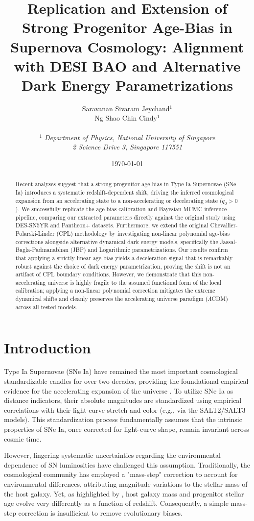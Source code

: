\documentclass[12pt, a4paper]{article}
\title{\textbf{Replication and Extension of Strong Progenitor Age-Bias in Supernova Cosmology: Alignment with DESI BAO and Alternative Dark Energy Parametrizations}}
\author{
    Saravanan Sivaram Jeychand$^{1}$ \\
    Ng Shao Chin Cindy$^{1}$ \\
    \vspace{0.2cm} \\
    \small $^{1}$ \textit{Department of Physics, National University of Singapore} \\
    \small \textit{2 Science Drive 3, Singapore 117551}
}
\date{\today}
\begin{document}
\maketitle

\begin{abstract}
Recent analyses \citep{son2025} suggest that a strong progenitor age-bias in Type Ia Supernovae (SNe Ia) introduces a systematic redshift-dependent shift, driving the inferred cosmological expansion from an accelerating state to a non-accelerating or decelerating state ($q_0 > 0$). We successfully replicate the age-bias calibration and Bayesian MCMC inference pipeline, comparing our extracted parameters directly against the original study using DES-SN5YR and Pantheon+ datasets. Furthermore, we extend the original Chevallier-Polarski-Linder (CPL) methodology by investigating non-linear polynomial age-bias corrections alongside alternative dynamical dark energy models, specifically the Jassal-Bagla-Padmanabhan (JBP) and Logarithmic parametrizations. Our results confirm that applying a strictly linear age-bias yields a deceleration signal that is remarkably robust against the choice of dark energy parametrization, proving the shift is not an artifact of CPL boundary conditions. However, we demonstrate that this non-accelerating universe is highly fragile to the assumed functional form of the local calibration; applying a non-linear polynomial correction mitigates the extreme dynamical shifts and cleanly preserves the accelerating universe paradigm ($\Lambda$CDM) across all tested models.
\end{abstract}

\newpage

\section{Introduction}
Type Ia Supernovae (SNe Ia) have remained the most important cosmological standardizable candles for over two decades, providing the foundational empirical evidence for the accelerating expansion of the universe \citep{riess1998, perlmutter1999}. To utilize SNe Ia as distance indicators, their absolute magnitudes are standardized using empirical correlations with their light-curve stretch and color (e.g., via the SALT2/SALT3 models). This standardization process fundamentally assumes that the intrinsic properties of SNe Ia, once corrected for light-curve shape, remain invariant across cosmic time.

However, lingering systematic uncertainties regarding the environmental dependence of SN luminosities have challenged this assumption. Traditionally, the cosmological community has employed a "mass-step" correction to account for environmental differences, attributing magnitude variations to the stellar mass of the host galaxy. Yet, as highlighted by \citet{son2025}, host galaxy mass and progenitor stellar age evolve very differently as a function of redshift. Consequently, a simple mass-step correction is insufficient to remove evolutionary biases. 
\end{document}
